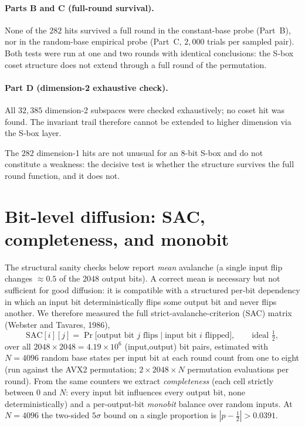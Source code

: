 \documentclass[11pt,a4paper]{article}
\begin{document}
\paragraph{Parts B and C (full-round survival).}
None of the $282$ hits survived a full round in the constant-base probe
(Part~B), nor in the random-base empirical probe (Part~C, $2{,}000$ trials per
sampled pair).  Both tests were run at one and two rounds with identical
conclusions: the S-box coset structure does not extend through a full round of
the permutation.

\paragraph{Part D (dimension-2 exhaustive check).}
All $32{,}385$ dimension-2 subspaces were checked exhaustively; no coset hit
was found.  The invariant trail therefore cannot be extended to higher dimension
via the S-box layer.

The $282$ dimension-1 hits are not unusual for an $8$-bit S-box and do not
constitute a weakness: the decisive test is whether the structure survives the
full round function, and it does not.

\section{Bit-level diffusion: SAC, completeness, and monobit}
\label{sec:sac}

The structural sanity checks below report \emph{mean} avalanche (a single input
flip changes $\approx0.5$ of the $2048$ output bits). A correct mean is
necessary but not sufficient for good diffusion: it is compatible with a
structured per-bit dependency in which an input bit deterministically flips some
output bit and never flips another. We therefore measured the full
strict-avalanche-criterion (SAC) matrix (Webster and Tavares, 1986),
\[
  \mathrm{SAC}[i][j] = \Pr\!\big[\text{output bit }j\text{ flips}\mid
  \text{input bit }i\text{ flipped}\big],\qquad\text{ideal }\tfrac12,
\]
over all $2048\times2048=4.19\times10^{6}$ (input,output) bit pairs, estimated
with $N=4096$ random base states per input bit at each round count from one to
eight (run against the AVX2 permutation; $2\times2048\times N$ permutation
evaluations per round). From the same counters we extract \emph{completeness}
(each cell strictly between $0$ and $N$: every input bit influences every output
bit, none deterministically) and a per-output-bit \emph{monobit} balance over
random inputs. At $N=4096$ the two-sided $5\sigma$ bound on a single proportion
is $|p-\tfrac12|>0.0391$.
\end{document}
